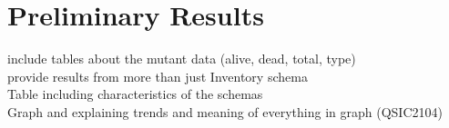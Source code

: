 \section{Preliminary Results}

include tables about the mutant data (alive, dead, total, type) \\
provide results from more than just Inventory schema \\
Table including characteristics of the schemas \\
Graph and explaining trends and meaning of everything in graph (QSIC2104)
